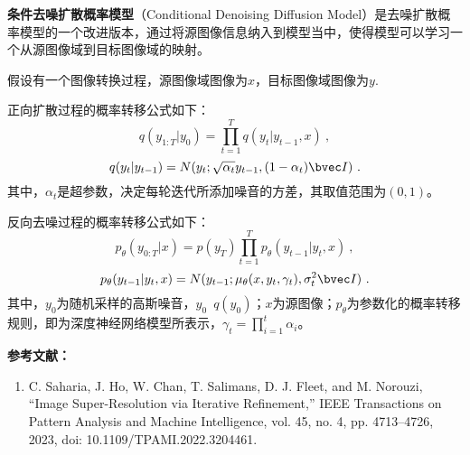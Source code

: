 

\textbf{条件去噪扩散概率模型}（Conditional Denoising Diffusion Model）是去噪扩散概率模型的一个改进版本，通过将源图像信息纳入到模型当中，使得模型可以学习一个从源图像域到目标图像域的映射。

假设有一个图像转换过程，源图像域图像为$x$，目标图像域图像为$y$.

正向扩散过程的概率转移公式如下：
\begin{equation}
q({y_{1:T}}|{y_0}) = \prod\limits_{t = 1}^T {q({y_t}|{y_{t - 1},x})}~,
\end{equation}
\begin{equation}
q({y_t}|{y_{t - 1}}) = {N}({y_t};\sqrt {\alpha_t} {y_{t - 1}},(1-\alpha_t) \bvec I)~.
\end{equation}
其中，$\alpha_t$是超参数，决定每轮迭代所添加噪音的方差，其取值范围为$(0,1)$。


反向去噪过程的概率转移公式如下：
\begin{equation}
{p_\theta }({y_{0:T}|x}) = p({y_T})\prod\limits_{t = 1}^T {{p_\theta }({y_{t - 1}}|{y_t,x})}~,
\end{equation}
\begin{equation}
{p_\theta }({y_{t - 1}}|{y_t,x}) = N({y_{t - 1}};{\mu _\theta }({x,y_t,\gamma_t}),\sigma_t^2 \bvec I)~.
\end{equation}
其中，$y_0$为随机采样的高斯噪音，$y_0$~$q(y_0)$；$x$为源图像；$p_\theta$为参数化的概率转移规则，即为深度神经网络模型所表示，$\gamma_t=\prod\limits_{i=1}^t\alpha_i$。


\textbf{参考文献：}
\begin{enumerate}
\item C. Saharia, J. Ho, W. Chan, T. Salimans, D. J. Fleet, and M. Norouzi, “Image Super-Resolution via Iterative Refinement,” IEEE Transactions on Pattern Analysis and Machine Intelligence, vol. 45, no. 4, pp. 4713–4726, 2023, doi: 10.1109/TPAMI.2022.3204461.
\end{enumerate}

